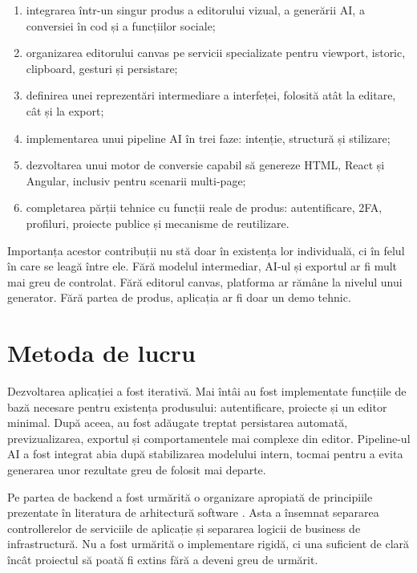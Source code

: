 \begin{enumerate}[leftmargin=1.5cm]
  \item integrarea într-un singur produs a editorului vizual, a generării AI, a conversiei în cod și a funcțiilor sociale;
  \item organizarea editorului canvas pe servicii specializate pentru viewport, istoric, clipboard, gesturi și persistare;
  \item definirea unei reprezentări intermediare a interfeței, folosită atât la editare, cât și la export;
  \item implementarea unui pipeline AI în trei faze: intenție, structură și stilizare;
  \item dezvoltarea unui motor de conversie capabil să genereze HTML, React și Angular, inclusiv pentru scenarii multi-page;
  \item completarea părții tehnice cu funcții reale de produs: autentificare, 2FA, profiluri, proiecte publice și mecanisme de reutilizare.
\end{enumerate}

Importanța acestor contribuții nu stă doar în existența lor individuală, ci în felul în care se leagă între ele. Fără modelul intermediar, AI-ul și exportul ar fi mult mai greu de controlat. Fără editorul canvas, platforma ar rămâne la nivelul unui generator. Fără partea de produs, aplicația ar fi doar un demo tehnic.

\section{Metoda de lucru}

Dezvoltarea aplicației a fost iterativă. Mai întâi au fost implementate funcțiile de bază necesare pentru existența produsului: autentificare, proiecte și un editor minimal. După aceea, au fost adăugate treptat persistarea automată, previzualizarea, exportul și comportamentele mai complexe din editor. Pipeline-ul AI a fost integrat abia după stabilizarea modelului intern, tocmai pentru a evita generarea unor rezultate greu de folosit mai departe.

Pe partea de backend a fost urmărită o organizare apropiată de principiile prezentate în literatura de arhitectură software \cite{bass2021softwarearchitecture,martin2017cleanarchitecture}. Asta a însemnat separarea controllerelor de serviciile de aplicație și separarea logicii de business de infrastructură. Nu a fost urmărită o implementare rigidă, ci una suficient de clară încât proiectul să poată fi extins fără a deveni greu de urmărit.

